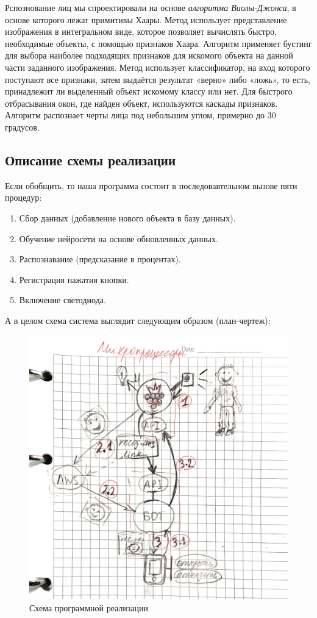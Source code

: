 \documentclass[a4paper,11pt]{article}
\begin{document}
\noindent Рспознование лиц мы спроектировали на основе \textit{алгоритма Виолы-Джонса}, в основе которого лежат примитивы Хаары. Метод использует представление изображения в интегральном виде,
которое позволяет вычислять быстро, необходимые объекты, с помощью
признаков Хаара. Алгоритм применяет бустинг для выбора наиболее подходящих признаков для искомого объекта
на данной части заданного изображения. Метод использует классификатор,
на вход которого поступают все признаки, затем выдаётся результат «верно»
либо «ложь», то есть, принадлежит ли выделенный объект искомому классу
или нет. Для быстрого отбрасывания окон, где найден объект, используются
каскады признаков. Алгоритм распознает
черты лица под небольшим углом, примерно до 30 градусов. \\

\subsection{Описание схемы реализации}
\noindent Если обобщить, то наша программа состоит в последовавтельном вызове пяти процедур:
\begin{enumerate}
  \item Сбор данных (добавление нового объекта в базу данных).
  \item Обучение нейросети на основе обновленных данных.
  \item Распознавание (предсказание в процентах).
  \item Регистрация нажатия кнопки.
  \item Включение светодиода.
\end{enumerate}
А в целом схема система выглядит следующим образом (план-чертеж):
\begin{figure}[h!]
  \begin{center}
    \includegraphics[scale=0.21]{images/рис_16.jpg}
  \caption{Схема программной реализации}
  \end{center}
\end{figure}
\end{document}

